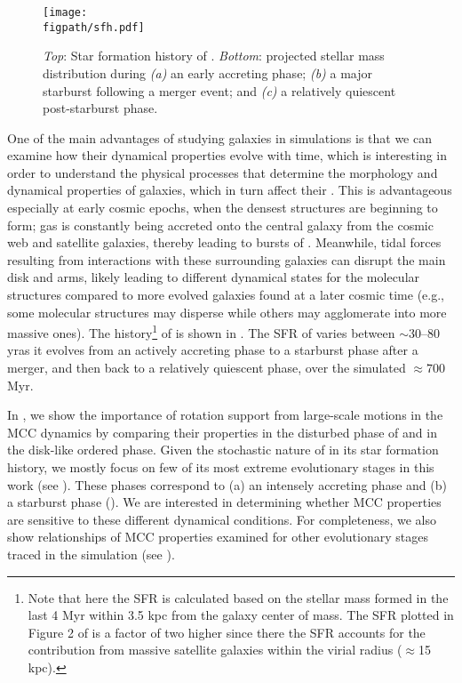 \IfFileExists{emulateapjlegacy.cls}{\documentclass[iop]{emulateapjlegacy}}{\documentclass[iop]{emulateapj}}
\def\figpath{./Fig}
\begin{document}
\begin{figure*}[hptb]
\centering
\texttt{[image: \\figpath/sfh.pdf]}
\caption{
    {\it Top}: Star formation history of \flower. {\it Bottom}: projected stellar mass distribution during {\it (a)} an early accreting phase;
    {\it (b)} a major starburst following a merger event; and {\it (c)} a relatively quiescent post-starburst phase.
    \label{fig:SFH}
   }
\end{figure*}

One of the main advantages of studying galaxies in simulations is that we can examine how their dynamical properties evolve with time, which is interesting in order to understand the physical processes that determine the morphology and dynamical properties of galaxies, which in turn affect their \SF.
%
This is advantageous especially at early cosmic epochs, when the densest structures are beginning to form; gas is constantly being accreted onto the central galaxy from the cosmic web and satellite galaxies, thereby leading to bursts of \SF.
%
Meanwhile, tidal forces resulting from interactions with these surrounding galaxies can disrupt the main disk and arms, likely leading to different dynamical states for the molecular structures compared to more evolved galaxies found at a later cosmic time (e.g., some molecular structures may disperse while others may agglomerate into more massive ones).
%
The \SF history\footnote{Note that here the SFR is calculated based on the stellar mass formed in the last 4 Myr within 3.5 kpc from the galaxy center of mass. The SFR plotted in Figure 2 of \citet{Pallottini17b} is a factor of two higher since there the SFR accounts for the contribution from massive satellite galaxies within the virial radius ($\approx$15\,kpc).} of \flower is shown in . The SFR of \flower varies between $\sim$30--80 \Msun\,yr\pmOne as it evolves from an actively accreting phase to a starburst phase after a merger, and then back to a relatively quiescent phase, over the simulated $\approx 700$\,Myr.

In , we show the importance of rotation support from large-scale motions in the MCC dynamics by comparing their properties in the disturbed phase of \flower and in the disk-like ordered phase.
%
Given the stochastic nature of \flower in its star formation history, we mostly focus on few of its most extreme evolutionary stages in this work (see ).
%
These phases correspond to (a) an intensely accreting phase and (b) a starburst phase (). We are interested in determining whether MCC properties are sensitive to these different dynamical conditions. For completeness, we also show relationships of MCC properties examined for other evolutionary stages traced in the simulation (see ).
\end{document}
